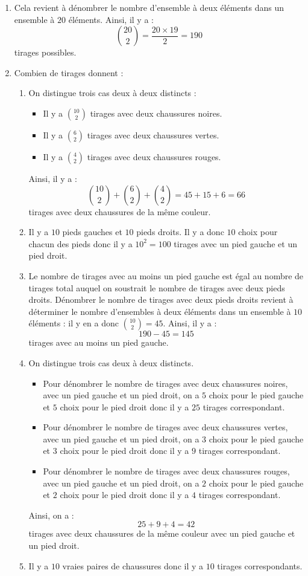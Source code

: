 \documentclass[a4paper,10pt]{report}
\begin{document}
\corr 
\begin{enumerate}
\item Cela revient à dénombrer le nombre d'ensemble à deux éléments dans un ensemble à $20$ éléments. Ainsi, il y a :
$$ \binom{20}{2} = \dfrac{20\times 19}{2} = 190$$
tirages possibles. 
\item 
Combien de tirages donnent :
\begin{enumerate}
\item On distingue trois cas deux à deux distincts :
\begin{itemize}
\item Il y a $\binom{10}{2}$ tirages avec deux chaussures noires.
\item Il y a $\binom{6}{2}$ tirages avec deux chaussures vertes.
\item Il y a $\binom{4}{2}$ tirages avec deux chaussures rouges.
\end{itemize}
Ainsi, il y a :
$$ \binom{10}{2} + \binom{6}{2} + \binom{4}{2} = 45+ 15+6=66$$
tirages avec deux chaussures de la même couleur.
\item Il y a $10$ pieds gauches et $10$ pieds droits. Il y a donc $10$ choix pour chacun des pieds donc il y a $10^2=100$ tirages avec un pied gauche et un pied droit.
\item Le nombre de tirages avec au moins un pied gauche est égal au nombre de tirages total auquel on soustrait le nombre de tirages avec deux pieds droits. Dénombrer le nombre de tirages avec deux pieds droits revient à déterminer le nombre d'ensembles à deux éléments dans un ensemble à $10$ éléments : il y en a donc $\binom{10}{2}=45$. Ainsi, il y a :
$$ 190 - 45= 145$$
tirages avec au moins un pied gauche. 
\item On distingue trois cas deux à deux distincts.
\begin{itemize}
\item Pour dénombrer le nombre de tirages avec deux chaussures noires, avec un pied gauche et un pied droit, on a $5$ choix pour le pied gauche et $5$ choix pour le pied droit donc il y a $25$ tirages correspondant.
\item Pour dénombrer le nombre de tirages avec deux chaussures vertes, avec un pied gauche et un pied droit, on a $3$ choix pour le pied gauche et $3$ choix pour le pied droit donc il y a $9$ tirages correspondant.
\item Pour dénombrer le nombre de tirages avec deux chaussures rouges, avec un pied gauche et un pied droit, on a $2$ choix pour le pied gauche et $2$ choix pour le pied droit donc il y a $4$ tirages correspondant.
\end{itemize}
Ainsi, on a :
$$ 25+9+4 = 42$$
tirages avec deux chaussures de la même couleur avec un pied gauche et un pied droit.
\item Il y a $10$ vraies paires de chaussures donc il y a $10$ tirages correspondants.
\end{enumerate}
\end{enumerate}
\end{document}
